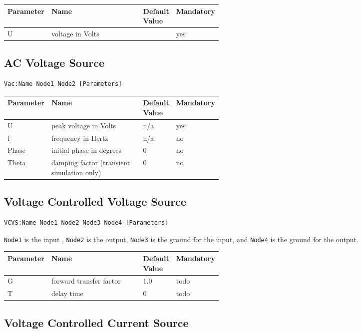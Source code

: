 \begin{tabular}{|l|p{0.5\linewidth}|l|l|}
\hline
Parameter & Name & Default Value & Mandatory \\
\hline
U & voltage in Volts & & yes \\
\hline
\end{tabular}


\subsection{AC Voltage Source}

\begin{verbatim}
Vac:Name Node1 Node2 [Parameters]
\end{verbatim}


\begin{tabular}{|l|p{0.5\linewidth}|l|l|}
\hline
Parameter & Name & Default Value & Mandatory \\
\hline
U & peak voltage in Volts & n/a & yes \\
f & frequency in Hertz & n/a & no \\
Phase & initial phase in degrees & 0 & no \\
Theta & damping factor (transient simulation only) & 0 & no \\
\hline
\end{tabular}



\subsection{Voltage Controlled Voltage Source}

\begin{verbatim}
VCVS:Name Node1 Node2 Node3 Node4 [Parameters]
\end{verbatim}

\verb+Node1+ is the input , \verb+Node2+ is the output, \verb+Node3+ is the ground for the input, and \verb+Node4+ is the ground for the output.


\begin{tabular}{|l|p{0.5\linewidth}|l|l|}
\hline
Parameter & Name & Default Value & Mandatory \\
\hline
G & forward transfer factor & 1.0 & todo \\
T & delay time & 0 & todo \\
\hline
\end{tabular}


\subsection{Voltage Controlled Current Source}


